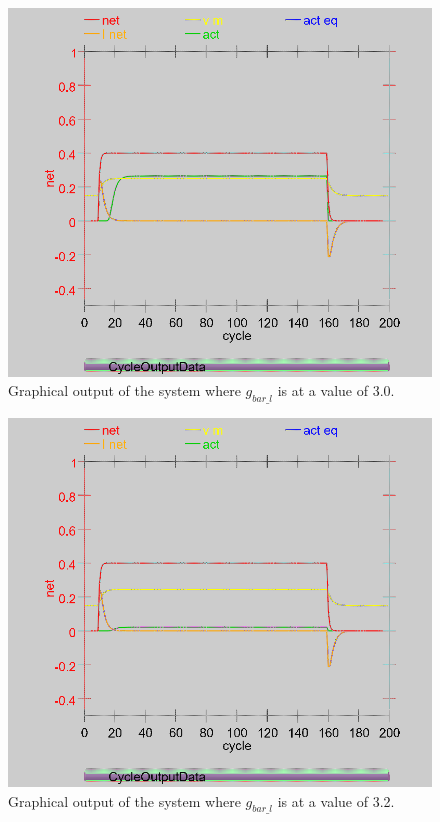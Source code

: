 \begin{multicols}{2}
\begin{figure}[H]
\centering
\includegraphics[scale=0.4]{Media/Main/EQ1/2.3.S1G.png}
\caption{Graphical output of the system where $g_{bar\_l}$ is at a value of 3.0.}
\label{Q2.31}
\end{figure}

\begin{figure}[H]
\centering
\includegraphics[scale=0.4]{Media/Main/EQ1/2.3.S2G.png}
\caption{Graphical output of the system where $g_{bar\_l}$ is at a value of 3.2.}
\label{Q2.32}
\end{figure}


\end{multicols}
